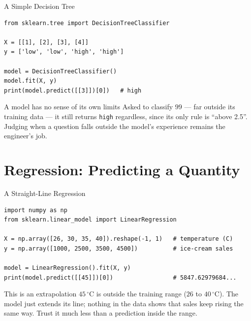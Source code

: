\documentclass[9pt,aspectratio=169,xcolor=table]{beamer}
\begin{document}
\begin{frame}[fragile]{A Simple Decision Tree}
    \leavevmode
\begin{lstlisting}
from sklearn.tree import DecisionTreeClassifier

X = [[1], [2], [3], [4]]
y = ['low', 'low', 'high', 'high']

model = DecisionTreeClassifier()
model.fit(X, y)
print(model.predict([[3]])[0])   # high
\end{lstlisting}

    \begin{alertblock}{A model has no sense of its own limits}
        Asked to classify $99$ --- far outside its training data --- it
        still returns \texttt{high} regardless, since its only rule is
        ``above 2.5''. Judging when a question falls outside the
        model's experience remains the engineer's job.
    \end{alertblock}
\end{frame}

\section{Regression: Predicting a Quantity}

\begin{frame}[fragile]{A Straight-Line Regression}
    \leavevmode
\begin{lstlisting}
import numpy as np
from sklearn.linear_model import LinearRegression

X = np.array([26, 30, 35, 40]).reshape(-1, 1)   # temperature (C)
y = np.array([1000, 2500, 3500, 4500])          # ice-cream sales

model = LinearRegression().fit(X, y)
print(model.predict([[45]])[0])                 # 5847.62979684...
\end{lstlisting}

    \begin{alertblock}{This is an extrapolation}
        $45\,^{\circ}\text{C}$ is \alert{outside} the training range
        ($26$ to $40\,^{\circ}\text{C}$). The model just extends its
        line; nothing in the data shows that sales keep rising the same
        way. Trust it much less than a prediction inside the range.
    \end{alertblock}
\end{frame}
\end{document}
